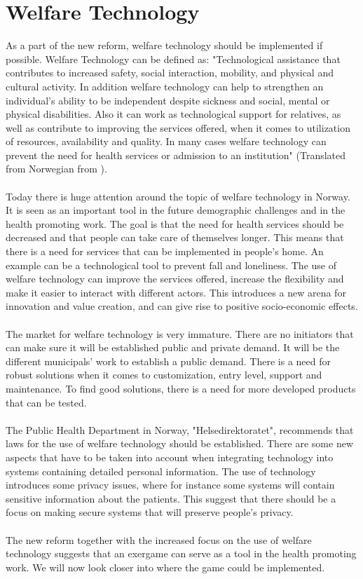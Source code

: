 \section{Welfare Technology}
As a part of the new reform, welfare technology should be implemented if possible. Welfare Technology can be defined as: "Technological assistance that contributes to increased safety, social interaction, mobility, and physical and cultural activity. In addition welfare technology can help to strengthen an individual's ability to be independent despite sickness and social, mental or physical disabilities. Also it can work as technological support for relatives, as well as contribute to improving the services offered, when it comes to utilization of resources, availability and quality. In many cases welfare technology can prevent the need for health services or admission to an institution" (Translated from Norwegian from \cite{welfare}).\\ \\
Today there is huge attention around the topic of welfare technology in Norway. It is seen as an important tool in the future demographic challenges and in the health promoting work.  The goal is that the need for health services should be decreased and that people can take care of themselves longer. This means that there is a need for services that can be implemented in people's home. An example can be a technological tool to prevent fall and loneliness.  The use of welfare technology can improve the services offered, increase the flexibility and make it easier to interact with different actors. This introduces a new arena for innovation and value creation, and can give rise to positive socio-economic effects. \\ \\
The market for welfare technology is very immature. There are no initiators that can make sure it will be established public and private demand. It will be the different municipals' work to establish a public demand. There is a need for robust solutions when it comes to customization, entry level, support and maintenance. To find good solutions, there is a need for more developed products that can be tested.\cite{welfare} \\ \\
The Public Health Department in Norway, "Helsedirektoratet", recommends that laws for the use of welfare technology should be established. There are some new aspects that have to be taken into account when integrating technology into systems containing detailed personal information. The use of technology introduces some privacy issues, where for instance some systems will contain  sensitive information about the patients. This suggest that there should be a focus on making secure systems that will preserve people’s privacy.\cite{welfare} \\ \\
The new reform together with the increased focus on the use of welfare technology suggests that an exergame can serve as a tool in the health promoting work. We will now look closer into where the game could be implemented.

